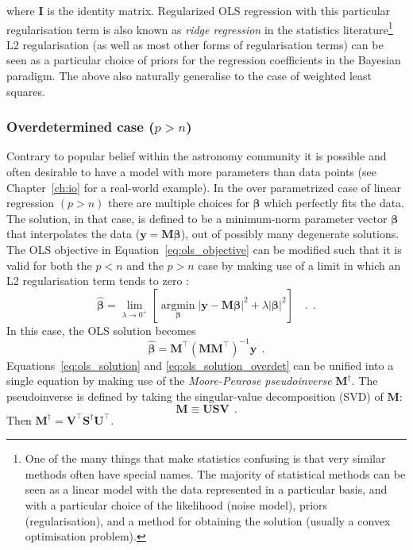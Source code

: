 \documentclass[12pt,dvipsnames]{report}
\renewcommand{\vec}[1]{\boldsymbol{\mathbf{#1}}}
\newcommand{\hquad}{~~}
\begin{document}
where $\vec{I}$ is the identity matrix. Regularized OLS regression with this particular
regularisation term is also known as \emph{ridge regression} in the statistics
literature\footnote{One of the many things that make statistics confusing is that very
    similar methods often have special names.  The majority
    of statistical methods can be seen as a linear model with the data represented in a particular
    basis, and with a particular choice of the likelihood (noise model), priors (regularisation),
    and  a method for obtaining the solution (usually a convex optimisation problem).}
L2 regularisation (as well as most other forms of regularisation terms) can be seen
as a particular choice of priors for the regression coefficients in the Bayesian paradigm.
The above also naturally generalise to the case of weighted least squares.

\subsubsection{Overdetermined case ($p > n$)}
Contrary to popular belief within the astronomy community it is possible and
often desirable to have a model with more parameters than data points (see
Chapter~\ref{ch:io} for a real-world example). In the over parametrized
case of linear regression $(p > n)$ there are multiple choices for $\vec\beta$
which perfectly fits the data. The solution, in that case, is defined to be a
minimum-norm parameter vector $\vec\beta$ that interpolates the data
($\vec{y}=\vec{M} \vec\beta$), out of possibly many degenerate solutions. The OLS
objective in Equation~\ref{eq:ols_objective} can be modified such that it is
valid for both the $p<n$ and the $p>n$ case by making use of a limit in which
an L2 regularisation term tends to zero \citep{arXiv:2101.07256}:
\begin{equation}
    \hat{\vec\beta}=\lim _{\lambda \rightarrow 0^{+}}\left[
    \underset{\vec\beta}{\operatorname{argmin}}\left|\vec{y}-\vec{M} \vec\beta\right|^{2} + \lambda \left|\vec\beta\right|^2\right]\quad .
    \hquad.
\end{equation}
In this case, the OLS solution becomes
\begin{equation}
    \hat{\vec\beta}=\vec{M}^{\intercal} (\vec{M} \vec{M}^{\intercal})^{-1} \vec{y}
    \hquad.
    \label{eq:ols_solution_overdet}
\end{equation}
Equations~\ref{eq:ols_solution} and \ref{eq:ols_solution_overdet} can be unified into a
single equation by making use of the \emph{Moore-Penrose pseudoinverse} $\vec{M}^\dagger$.
The pseudoinverse is defined by taking the singular-value decomposition (SVD)
of $\vec{M}$:
\begin{equation}
    \vec{M}\equiv\vec{U} \vec{S} \vec{V}
    \hquad.
\end{equation}
Then $\vec{M}^\dagger =  \vec{V}^{\intercal} \vec{S}^{\dagger} \vec{U}^{\intercal}$.
\end{document}
